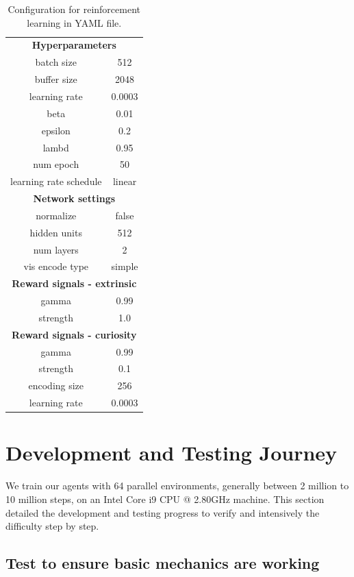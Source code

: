 \documentclass[conference]{IEEEtran}
\begin{document}
\begin{table}[t]
\centering
\caption{Configuration for reinforcement learning in YAML file.}
\begin{tabular}{c|c}
\hline
\hline
\multicolumn{2}{c}{\textbf{Hyperparameters}} \\ 
batch size & 512 \\
buffer size & 2048 \\
learning rate & 0.0003 \\
beta & 0.01 \\
epsilon & 0.2 \\
lambd & 0.95 \\
num epoch & 50 \\
learning rate schedule & linear \\
\hline
\multicolumn{2}{c}{\textbf{Network settings}} \\ 
normalize & false \\
hidden units & 512 \\
num layers & 2 \\
vis encode type & simple \\
\hline
\multicolumn{2}{c}{\textbf{Reward signals - extrinsic}} \\ 
gamma & 0.99 \\
strength & 1.0 \\
\hline
\multicolumn{2}{c}{\textbf{Reward signals - curiosity}} \\ 
gamma & 0.99 \\
strength & 0.1 \\
encoding size & 256 \\
learning rate & 0.0003 \\
\hline
\hline
\end{tabular}
\label{table_params}
\end{table}

\section{Development and Testing Journey}

We train our agents with 64 parallel environments, generally between 2 million to 10 million steps, on an Intel Core i9 CPU @ 2.80GHz machine. This section detailed the development and testing progress to verify and intensively the difficulty step by step.

\subsection{Test to ensure basic mechanics are working}
\end{document}
